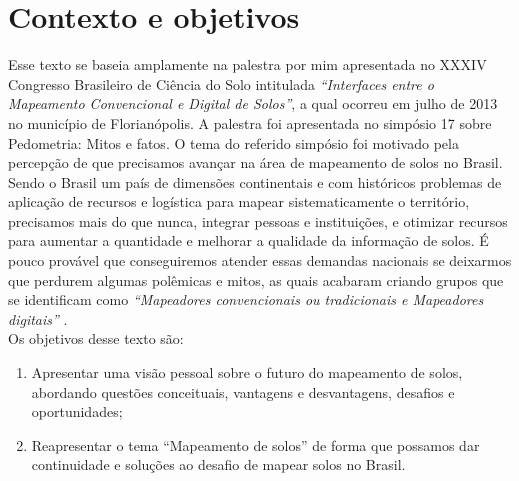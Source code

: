 \section{Contexto e objetivos}
Esse texto se baseia amplamente na palestra por mim apresentada no XXXIV Congresso Brasileiro de Ciência do Solo intitulada \emph{``Interfaces entre o Mapeamento Convencional e Digital de Solos''}, a qual ocorreu em julho de 2013 no município de Florianópolis. A palestra foi apresentada no simpósio 17 sobre Pedometria: Mitos e fatos. O tema do referido simpósio foi motivado pela percepção de que precisamos avançar na área de mapeamento de solos no Brasil. Sendo o Brasil um país de dimensões continentais e com históricos problemas de aplicação de recursos e logística para mapear sistematicamente o território, precisamos mais do que nunca, integrar pessoas e instituições, e otimizar recursos para aumentar a quantidade e melhorar a qualidade da informação de solos. É pouco provável que conseguiremos atender essas demandas nacionais se deixarmos que perdurem algumas polêmicas e mitos, as quais acabaram criando grupos que se identificam como \emph{``Mapeadores convencionais ou tradicionais e Mapeadores digitais''}
.\\
Os objetivos desse texto são:
\begin{enumerate}
\item Apresentar uma visão pessoal sobre o futuro do mapeamento de solos, abordando questões conceituais, vantagens e desvantagens, desafios e oportunidades;
\item Reapresentar o tema ``Mapeamento de solos'' de forma que possamos dar continuidade e soluções ao desafio de mapear solos no Brasil.
\end{enumerate}
